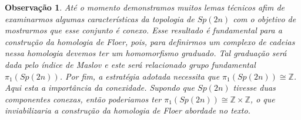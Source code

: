 \documentclass[12pt]{book}
\newtheorem{observacao}[teorema]{Observação}
\newcommand{\grupofundamental}[1]{\pi_{1}(#1)}
\newcommand{\gruposimpletico}[1]{Sp(#1)}
\newcommand{\inteiros}{\mathbb{Z}}
\begin{document}
	\begin{observacao}\label{observacao_conexidade_grupo_simpletico}
		Até o momento demonstramos muitos lemas técnicos afim de examinarmos algumas características da topologia de $\gruposimpletico{2n}$ com o objetivo de mostrarmos que esse conjunto é conexo. Esse resultado é fundamental para a construção da homologia de Floer, pois, para definirmos um complexo de cadeias nessa homologia devemos ter um homomorfismo graduado. Tal graduação será dada pelo índice de Maslov e este será relacionado grupo fundamental $\grupofundamental{\gruposimpletico{2n}}$. Por fim, a estratégia adotada necessita que $\grupofundamental{\gruposimpletico{2n}} \cong \inteiros$. Aqui esta a importância da conexidade. Supondo que $\gruposimpletico{2n}$ tivesse duas componentes conexas, então poderiamos ter $\grupofundamental{\gruposimpletico{2n}} \cong \inteiros \times \inteiros$, o que inviabilizaria a construção da homologia de Floer abordade no texto.
	\end{observacao}
	
\end{document}
